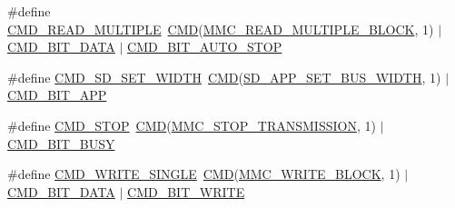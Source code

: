 \begin{DoxyCompactItemize}
\item 
\#define \hyperlink{group___s_d_m_m_c__18_x_x__43_x_x_gaba8192ab3effa505c455e8c3055dc87f}{C\+M\+D\+\_\+\+R\+E\+A\+D\+\_\+\+M\+U\+L\+T\+I\+P\+LE}~\hyperlink{group___s_d_m_m_c__18_x_x__43_x_x_ga7caafa608408eea45aca375d0d5eb211}{C\+MD}(\hyperlink{group___c_h_i_p___s_d_m_m_c___definitions_ga16f975fa60cdd20c9ec28984b7963213}{M\+M\+C\+\_\+\+R\+E\+A\+D\+\_\+\+M\+U\+L\+T\+I\+P\+L\+E\+\_\+\+B\+L\+O\+CK}, 1) $\vert$ \hyperlink{group___s_d_m_m_c__18_x_x__43_x_x_gac4b629fb5a202bac675389cf3e28a197}{C\+M\+D\+\_\+\+B\+I\+T\+\_\+\+D\+A\+TA} $\vert$ \hyperlink{group___s_d_m_m_c__18_x_x__43_x_x_ga54467a0e80fd68c54419d4e6598c05d8}{C\+M\+D\+\_\+\+B\+I\+T\+\_\+\+A\+U\+T\+O\+\_\+\+S\+T\+OP}
\item 
\#define \hyperlink{group___s_d_m_m_c__18_x_x__43_x_x_ga68a5b18a28b246e42bdc422729718861}{C\+M\+D\+\_\+\+S\+D\+\_\+\+S\+E\+T\+\_\+\+W\+I\+D\+TH}~\hyperlink{group___s_d_m_m_c__18_x_x__43_x_x_ga7caafa608408eea45aca375d0d5eb211}{C\+MD}(\hyperlink{group___c_h_i_p___s_d_m_m_c___definitions_ga4789af331712cf3fa2e7574f8f6665a3}{S\+D\+\_\+\+A\+P\+P\+\_\+\+S\+E\+T\+\_\+\+B\+U\+S\+\_\+\+W\+I\+D\+TH}, 1) $\vert$ \hyperlink{group___s_d_m_m_c__18_x_x__43_x_x_ga201daaaa1ac9cd5e8e9c6cc3a1472038}{C\+M\+D\+\_\+\+B\+I\+T\+\_\+\+A\+PP}
\item 
\#define \hyperlink{group___s_d_m_m_c__18_x_x__43_x_x_ga46dc7ae84992bfe62cc00731959a67f4}{C\+M\+D\+\_\+\+S\+T\+OP}~\hyperlink{group___s_d_m_m_c__18_x_x__43_x_x_ga7caafa608408eea45aca375d0d5eb211}{C\+MD}(\hyperlink{group___c_h_i_p___s_d_m_m_c___definitions_gaf6b57664a9ce7bd0e768b033c09ac43c}{M\+M\+C\+\_\+\+S\+T\+O\+P\+\_\+\+T\+R\+A\+N\+S\+M\+I\+S\+S\+I\+ON}, 1) $\vert$ \hyperlink{group___s_d_m_m_c__18_x_x__43_x_x_gaad6daa707d0fd2762f906bd1dc2cc240}{C\+M\+D\+\_\+\+B\+I\+T\+\_\+\+B\+U\+SY}
\item 
\#define \hyperlink{group___s_d_m_m_c__18_x_x__43_x_x_ga41a9ae4efad0a16a54114133fe95dafb}{C\+M\+D\+\_\+\+W\+R\+I\+T\+E\+\_\+\+S\+I\+N\+G\+LE}~\hyperlink{group___s_d_m_m_c__18_x_x__43_x_x_ga7caafa608408eea45aca375d0d5eb211}{C\+MD}(\hyperlink{group___c_h_i_p___s_d_m_m_c___definitions_ga991d94c3be5fd4548d5bb222d03500f9}{M\+M\+C\+\_\+\+W\+R\+I\+T\+E\+\_\+\+B\+L\+O\+CK}, 1) $\vert$ \hyperlink{group___s_d_m_m_c__18_x_x__43_x_x_gac4b629fb5a202bac675389cf3e28a197}{C\+M\+D\+\_\+\+B\+I\+T\+\_\+\+D\+A\+TA} $\vert$ \hyperlink{group___s_d_m_m_c__18_x_x__43_x_x_ga78e0e4e25dd9e13cdcbecc9f396b2150}{C\+M\+D\+\_\+\+B\+I\+T\+\_\+\+W\+R\+I\+TE}
\item 

\end{DoxyCompactItemize}
